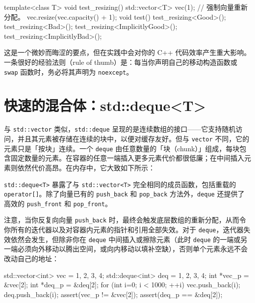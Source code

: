 \begin{codebox}[cpp]
    template<class T>
    void test_resizing()
    {
      std::vector<T> vec(1);
      // 强制向量重新分配。
      vec.resize(vec.capacity() + 1);
    }
    void test()
    {
      test_resizing<Good>();
      test_resizing<Bad>();
      test_resizing<ImplicitlyGood>();
      test_resizing<ImplicitlyBad>();
    }
\end{codebox}

这是一个微妙而晦涩的要点，但在实践中会对你的 C++ 代码效率产生重大影响。一条很好的经验法则（rule of thumb）是：每当你声明自己的移动构造函数或 \texttt{swap} 函数时，务必将其声明为 \texttt{noexcept}。

\section{快速的混合体：std::deque<T>}

与 \texttt{std::\allowbreak{}vector} 类似，\texttt{std::\allowbreak{}deque} 呈现的是连续数组的接口——它支持随机访问，并且其元素被存储在连续的块中，以便对缓存友好。但与 \texttt{vector} 不同，它的元素只是「按块」连续。一个 \texttt{deque} 由任意数量的「块（chunk）」组成，每块包含固定数量的元素。在容器的任意一端插入更多元素代价都很低廉；在中间插入元素则依然代价高昂。在内存中，它大致如下所示：


\texttt{std::\allowbreak{}deque<\allowbreak{}T>\allowbreak{}} 暴露了与 \texttt{std::\allowbreak{}vector<\allowbreak{}T>\allowbreak{}} 完全相同的成员函数，包括重载的 \texttt{operator[]}。除了向量已有的 \texttt{push\_\allowbreak{}back} 和 \texttt{pop\_\allowbreak{}back} 方法外，\texttt{deque} 还提供了高效的 \texttt{push\_\allowbreak{}front} 和 \texttt{pop\_\allowbreak{}front}。

注意，当你反复向向量 \texttt{push\_\allowbreak{}back} 时，最终会触发底层数组的重新分配，从而令你所有的迭代器以及对容器内元素的指针和引用全部失效。对于 \texttt{deque}，迭代器失效依然会发生，但除非你在 \texttt{deque} 中间插入或擦除元素（此时 \texttt{deque} 的一端或另一端必须向外移动以腾出空间，或向内移动以填补空缺），否则单个元素永远不会改动自己的地址：

\begin{codebox}[cpp]
    std::vector<int> vec = {1, 2, 3, 4};
    std::deque<int> deq = {1, 2, 3, 4};
    int *vec_p = &vec[2];
    int *deq_p = &deq[2];
    for (int i=0; i < 1000; ++i) {
      vec.push_back(i);
      deq.push_back(i);
    }
    assert(vec_p != &vec[2]);
    assert(deq_p == &deq[2]);
\end{codebox}

